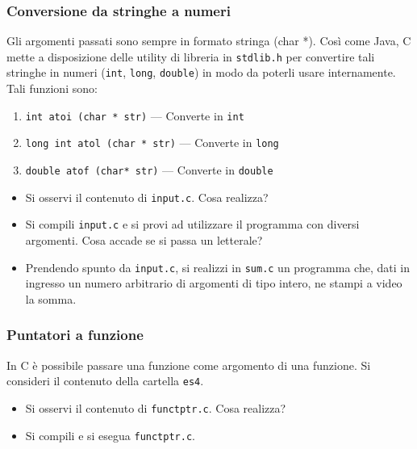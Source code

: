 \documentclass{beamer}
\begin{document}
\begin{frame}[fragile]
\frametitle{Conversione da stringhe a numeri}
Gli argomenti passati sono sempre in formato stringa (char *). Così come Java, C mette a disposizione delle utility di libreria in \texttt{stdlib.h} per convertire tali stringhe in numeri (\texttt{int}, \texttt{long}, \texttt{double}) in modo da poterli usare internamente. Tali funzioni sono:
\begin{enumerate}
 \item \texttt{int atoi (char * str)} --- Converte in \texttt{int}
 \item \texttt{long int atol (char * str)} --- Converte in \texttt{long}
 \item \texttt{double atof (char* str)} --- Converte in \texttt{double}
\end{enumerate}
\begin{itemize}
 \item Si osservi il contenuto di \texttt{input.c}. Cosa realizza?
 \item Si compili \texttt{input.c} e si provi ad utilizzare il programma con diversi argomenti. Cosa accade se si passa un letterale?
 \item Prendendo spunto da \texttt{input.c}, si realizzi in \texttt{sum.c} un programma che, dati in ingresso un numero arbitrario di argomenti di tipo intero, ne stampi a video la somma.
\end{itemize}
\end{frame}

\begin{frame}[fragile]
\frametitle{Puntatori a funzione}
In C è possibile passare una funzione come argomento di una funzione. Si consideri il contenuto della cartella \texttt{es4}.
\begin{itemize}
 \item Si osservi il contenuto di \texttt{functptr.c}. Cosa realizza?
 \item Si compili e si esegua \texttt{functptr.c}.
\end{itemize}
\end{frame}
\end{document}

